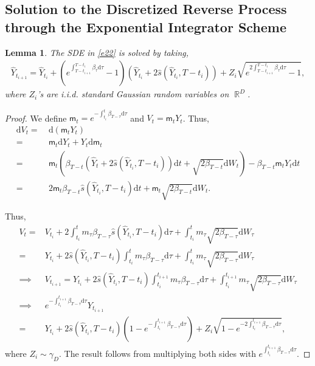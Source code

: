\documentclass[12pts]{article}
\newtheorem{lemma}[defn]{Lemma}%
\def\Real{\mathop{\mathbb{R}}\nolimits}
\newcommand{\diff}{\mathrm{d}}
\newcommand{\hY}{ \widehat{Y}}
\begin{document}
\subsection{Solution to the Discretized Reverse Process through the Exponential Integrator Scheme}
\begin{lemma}\label{lem_a.1}
The SDE in \eqref{e22} is solved by taking,
\begin{align*}
    \hY_{t_{i+1}} = \hY_{t_i} + \left(e^{\int_{T-t_{i+1}}^{T-t_i} \beta_\tau \diff  \tau} - 1\right)\left(\hY_{t_i} + 2 \hat{s}(\hY_{t_i}, T-t_i)\right) + Z_{i} \sqrt{e^{2\int_{T-t_{i+1}}^{T-t_i} \beta_\tau \diff  \tau} - 1},
\end{align*}    
where $Z_i$'s are i.i.d. standard Gaussian random variables on $\Real^D$.
\end{lemma}
\begin{proof}
    We define $\mathsf{m}_t = e^{-\int_{t_i}^ t \beta_{T-\tau} \diff  \tau}$ and $V_t = \mathsf{m}_t Y_t$. Thus,
    \begingroup
    \allowdisplaybreaks
    \begin{align}
        \diff  V_t = & \ \diff  (\mathsf{m}_t Y_t) \nonumber\\
        = & \ \mathsf{m}_t \diff  Y_t + Y_t \diff  \mathsf{m}_t \nonumber\\
        = & \ \mathsf{m}_t \left(\beta_{T-t} (\hat{Y}_t + 2 \hat{s}(\hY_{t_i}, T-t_i)) \diff  t + \sqrt{2 \beta_{T-t}} \diff  W_t \right) - \beta_{T-t} \mathsf{m}_t Y_t \diff  t \nonumber\\
        = & \ 2 \mathsf{m}_t \beta_{T-t}   \hat{s}(\hY_{t_i}, T-t_i) \diff  t + \mathsf{m}_t \sqrt{2 \beta_{T-t}} \diff  W_t. 
    \end{align}
    \endgroup

Thus,
\begingroup
\allowdisplaybreaks
\begin{align*}
    V_t = & V_{t_{i}} +  2 \int_{t_i}^t m_\tau \beta_{T-\tau}   \hat{s}(\hY_{t_i}, T-t_i) \diff \tau + \int_{t_i}^t m_\tau \sqrt{2 \beta_{T-\tau}} \diff  W_\tau \\
    = & Y_{t_i} + 2 \hat{s}(\hY_{t_i}, T-t_i)  \int_{t_i}^t m_\tau \beta_{T-\tau}   \diff \tau + \int_{t_i}^t m_\tau \sqrt{2 \beta_{T-\tau}} \diff  W_\tau \\
    \implies & V_{t_{i+1}} =   Y_{t_i} + 2 \hat{s}(\hY_{t_i}, T-t_i)  \int_{t_i}^{t_{i+1}} m_\tau \beta_{T-\tau}   \diff \tau + \int_{t_i}^{t_{i+1}} m_\tau \sqrt{2 \beta_{T-\tau}} \diff  W_\tau \\
   \implies & e^{-\int_{t_i}^{t_{i+1}} \beta_{T-\tau} \diff \tau} Y_{t_{i+1}} \\ = & Y_{t_i} + 2 \hat{s}(\hY_{t_i}, T-t_i) \left(1 - e^{-\int_{t_i}^{t_{i+1}} \beta_{T-\tau} \diff \tau}\right) + Z_i \sqrt{1 - e^{-2 \int_{t_i}^{t_{i+1}} \beta_{T-\tau} \diff \tau} },
\end{align*}
\endgroup
where $Z_i \sim \gamma_D$. The result follows from multiplying both sides with $e^{\int_{t_i}^{t_{i+1}} \beta_{T-\tau} \diff \tau} $.
\end{proof}
\end{document}
